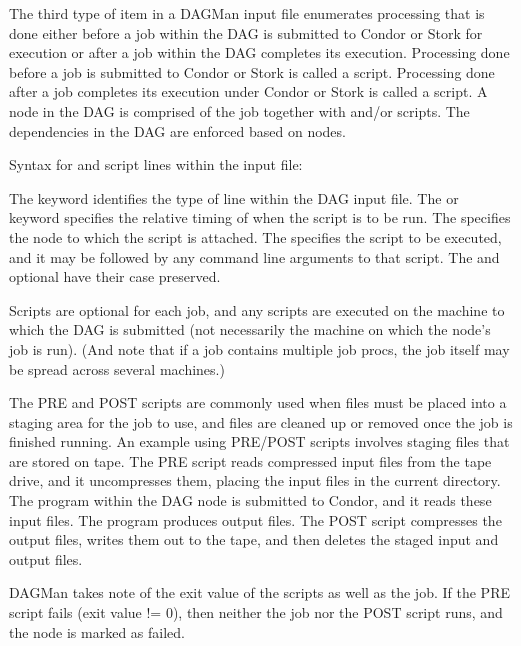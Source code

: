 The third type of item in a DAGMan input file enumerates
processing that is done either before a job within
the DAG is submitted to Condor or Stork for execution
or after
a job within
the DAG completes its execution.
Processing done before a job is submitted to Condor or Stork is
called a  script.
Processing done after a job completes
its execution under Condor or Stork is
called a  script.
A node in the DAG is comprised of the job together with
 and/or  scripts.
The dependencies in the DAG are enforced based on nodes.

Syntax for  and  script lines within the input file:

    

     

The  keyword identifies the type of line within
the DAG input file.
The  or  keyword
specifies the relative timing of when the script is to be run.
The  specifies the node to which the script is attached.
The 
specifies the script to be executed, and it
may be followed by any command line arguments to that script.
The  and optional  have their
case preserved.

Scripts are optional for each job, and
any scripts are executed on the machine
to which the DAG is submitted (not necessarily
the machine on which the node's job is run).
(And note that if a job contains multiple job procs,
the job itself may be spread across several machines.)

The PRE and POST scripts are commonly used
when files must be placed into a staging area for the job to use,
and files are cleaned up or removed once the job is finished running.
An example using PRE/POST scripts involves staging files
that are stored on tape.
The PRE script reads compressed input files from the tape drive,
and it uncompresses them, placing the input files in the current directory.
The program within the DAG node is submitted to Condor,
and it reads these input files.
The program produces output files.
The POST script compresses the output files, writes them out to
the tape, and then deletes the staged input and output files.

DAGMan takes note of the exit value of the
scripts as well as the job.
If the PRE script fails (exit value != 0), then neither the job nor
the POST script runs, and the node is marked as failed.

